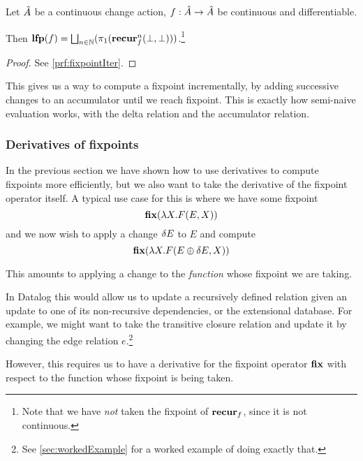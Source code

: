 \begin{thm}[name=Incremental computation of least fixpoints, restate=fixpointIter]
\label{thm:fixpointIter}
  Let $\hat{A}$ be a continuous change action, $f: \hat{A} \rightarrow
  \hat{A}$ be continuous and differentiable.

  Then $\mathbf{lfp}(f) = \bigsqcup_{n \in \mathbb{N}}(\pi_1(\mathbf{recur}_f^n(\bot, \bot)))$.\footnote{
    Note that we have \emph{not} taken the fixpoint of $\mathbf{recur}_f$, since it is
    not continuous.}
\end{thm}
\ifproofs
\begin{proof}
  See \cref{prf:fixpointIter}.
\end{proof}
\fi

This gives us a way to compute a fixpoint incrementally, by adding successive
changes to an accumulator until we reach fixpoint. This is exactly how
semi-naive evaluation works, with the delta relation and the accumulator relation.

\subsubsection{Derivatives of fixpoints}
\label{sec:fixpointDerivatives}

In the previous section we have shown how to use derivatives to compute fixpoints
more efficiently, but we also want to take the derivative of the fixpoint
operator itself. A typical use case for this is where we have some fixpoint
\begin{displaymath}
  \mathbf{fix} (\lambda X . F(E, X))
\end{displaymath}
and we now wish to apply a change $\delta E$ to $E$ and compute
\begin{displaymath}
  \mathbf{fix} (\lambda X . F(E \oplus \delta E, X))
\end{displaymath}

This amounts to applying a change to the \emph{function} whose fixpoint we are taking.

In Datalog this would allow us to update a recursively defined relation given an
update to one of its non-recursive dependencies, or the extensional database.
For example, we might want to take the transitive closure relation
and update it by changing the edge relation $e$.\footnote{See
  \cref{sec:workedExample} for a worked example of doing exactly that.}

However, this requires us to have a derivative for the fixpoint operator
$\mathbf{fix}$ with respect to the function whose fixpoint is being taken.

